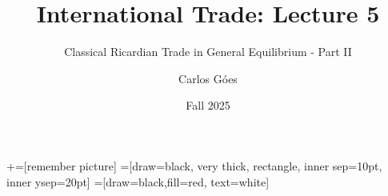\documentclass[notes,11pt, aspectratio=169, xcolor=table]{beamer}
\title[]{International Trade: Lecture 5}
\subtitle[]{Classical Ricardian Trade in General Equilibrium - Part II}
\author[Góes]
{Carlos Góes\inst{1}}
\date{Fall 2025}
\institute[GWU]{\inst{1} George Washington University }
\begin{document}
\newcommand\marktopleft[1]{%
    \tikz[overlay,remember picture] 
        \node (marker-#1-a) at (-.3em,.3em) {};%
}
\newcommand\markbottomright[2]{%
    \tikz[overlay,remember picture] 
        \node (marker-#1-b) at (0em,0em) {};%
}
+=[remember picture] 
 =[draw=black, very thick, rectangle, inner sep=10pt, inner ysep=20pt]
 =[draw=black,fill=red, text=white]















\frame{\titlepage}
\addtocounter{framenumber}{-1}



\end{document}
